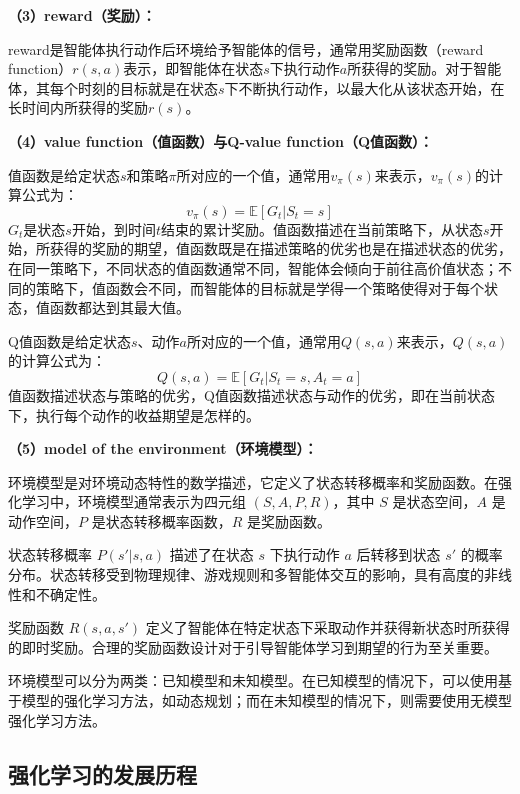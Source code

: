 \documentclass[12pt,a4paper,UTF8]{ctexart}
\numberwithin{equation}{section}
\begin{document}
\textbf{（3）reward（奖励）：}

reward是智能体执行动作后环境给予智能体的信号，通常用奖励函数（reward function）$r(s,a)$表示，即智能体在状态$s$下执行动作$a$所获得的奖励。对于智能体，其每个时刻的目标就是在状态$s$下不断执行动作，以最大化从该状态开始，在长时间内所获得的奖励$r(s)$。

\textbf{（4）value function（值函数）与Q-value function（Q值函数）：}

值函数是给定状态$s$和策略$\pi$所对应的一个值，通常用$v_\pi(s)$来表示，$v_\pi(s)$的计算公式为：
\begin{equation}
    v_\pi(s) = \mathbb{E}[G_t|S_t=s]
    \label{eq:value_function}
\end{equation}
$G_t$是状态$s$开始，到时间$t$结束的累计奖励。值函数描述在当前策略下，从状态$s$开始，所获得的奖励的期望，值函数既是在描述策略的优劣也是在描述状态的优劣，在同一策略下，不同状态的值函数通常不同，智能体会倾向于前往高价值状态；不同的策略下，值函数会不同，而智能体的目标就是学得一个策略使得对于每个状态，值函数都达到其最大值。

Q值函数是给定状态$s$、动作$a$所对应的一个值，通常用$Q(s,a)$来表示，$Q(s,a)$的计算公式为：
\begin{equation}
    Q(s,a) = \mathbb{E}[G_t|S_t=s,A_t=a]
    \label{eq:q_value_function}
\end{equation}
值函数描述状态与策略的优劣，Q值函数描述状态与动作的优劣，即在当前状态下，执行每个动作的收益期望是怎样的。

\textbf{（5）model of the environment（环境模型）：}

环境模型是对环境动态特性的数学描述，它定义了状态转移概率和奖励函数。在强化学习中，环境模型通常表示为四元组 $(S, A, P, R)$，其中 $S$ 是状态空间，$A$ 是动作空间，$P$ 是状态转移概率函数，$R$ 是奖励函数。

状态转移概率 $P(s'|s,a)$ 描述了在状态 $s$ 下执行动作 $a$ 后转移到状态 $s'$ 的概率分布。状态转移受到物理规律、游戏规则和多智能体交互的影响，具有高度的非线性和不确定性。

奖励函数 $R(s,a,s')$ 定义了智能体在特定状态下采取动作并获得新状态时所获得的即时奖励。合理的奖励函数设计对于引导智能体学习到期望的行为至关重要。

环境模型可以分为两类：已知模型和未知模型。在已知模型的情况下，可以使用基于模型的强化学习方法，如动态规划；而在未知模型的情况下，则需要使用无模型强化学习方法。

\subsection{强化学习的发展历程}
\end{document}
